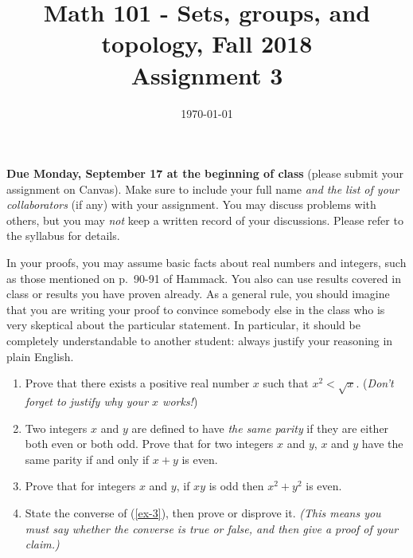 \documentclass{amsart}
\title[Math 101, Fall 2018: assignment 3]{Math 101 - Sets, groups, and topology, Fall 2018 \\ Assignment 3}
\date{\today}
\theoremstyle{definition}
\begin{document}

\maketitle

\textbf{Due Monday, September 17 at the beginning of class} (please submit your assignment on Canvas). Make sure to include your full name \emph{and the list of your collaborators} (if any) with your assignment. You may discuss problems with others, but you may \emph{not} keep a written record of your discussions. Please refer to the syllabus for details.

In your proofs, you may assume basic facts about real numbers and integers, such as those mentioned on p.~90-91 of Hammack. You also can use results covered in class or results you have proven already. As a general rule, you should imagine that you are writing your proof to convince somebody else in the class who is very skeptical about the particular statement. In particular, it should be completely understandable to another student: always justify your reasoning in plain English. 

\begin{enumerate}
\item Prove that there exists a positive real number $x$ such that $x^2 < \sqrt{x}$. (\emph{Don't forget to justify why your $x$ works!})
\item Two integers $x$ and $y$ are defined to have \emph{the same parity} if they are either both even or both odd. Prove that for two integers $x$ and $y$, $x$ and $y$ have the same parity if and only if $x + y$ is even.
\item\label{ex-3} Prove that for integers $x$ and $y$, if $xy$ is odd then $x^2 + y^2$ is even.
\item State the converse of (\ref{ex-3}), then prove or disprove it. \emph{(This means you must say whether the converse is true or false, and then give a proof of your claim.)}

\end{enumerate}


\end{document}
